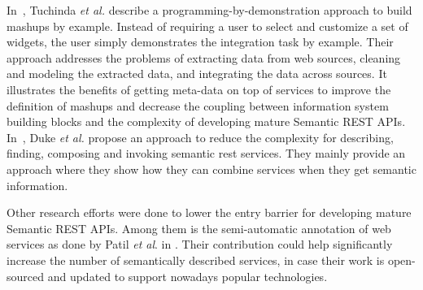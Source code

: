 In~\cite{Tuchinda:2011:BMD:1993053.1993058}, Tuchinda \textit{et al.} describe a programming-by-demonstration approach to build mashups by example. Instead of requiring a user to select and customize a set of widgets, the user simply demonstrates the integration task by example. Their approach addresses the problems of extracting data from web sources, cleaning and modeling the extracted data, and integrating the data across sources. It illustrates the benefits of getting meta-data on top of services to improve the definition of mashups and decrease the coupling between information system building blocks and the complexity of  developing mature Semantic REST APIs. In~\cite{10.1007/978-3-642-17694-4_11}, Duke \textit{et al.} propose an approach to reduce the complexity for describing, finding, composing and invoking semantic rest services. They mainly provide an approach where they show how they can combine services when they get semantic information. 

Other research efforts were done to lower the entry barrier for developing mature Semantic REST APIs. Among them is the semi-automatic annotation of web services as done by Patil \textit{et al}. in \cite{patil2004meteor}. Their contribution could help significantly increase the number of semantically described services, in case their work is open-sourced and updated to support nowadays popular technologies.


